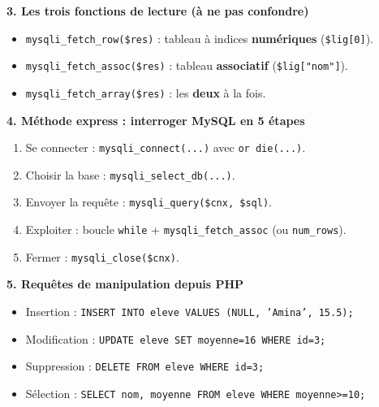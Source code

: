 \documentclass[11pt]{article}
\begin{document}
\begin{bilan}
\textbf{3. Les trois fonctions de lecture (à ne pas confondre)}
\begin{itemize}
  \item \texttt{mysqli\_fetch\_row(\$res)} : tableau à indices \textbf{numériques} (\texttt{\$lig[0]}).
  \item \texttt{mysqli\_fetch\_assoc(\$res)} : tableau \textbf{associatif} (\texttt{\$lig["nom"]}).
  \item \texttt{mysqli\_fetch\_array(\$res)} : les \textbf{deux} à la fois.
\end{itemize}

\textbf{4. Méthode express : interroger MySQL en 5 étapes}
\begin{enumerate}
  \item Se connecter : \texttt{mysqli\_connect(...)} avec \texttt{or die(...)}.
  \item Choisir la base : \texttt{mysqli\_select\_db(...)}.
  \item Envoyer la requête : \texttt{mysqli\_query(\$cnx, \$sql)}.
  \item Exploiter : boucle \texttt{while} + \texttt{mysqli\_fetch\_assoc} (ou \texttt{num\_rows}).
  \item Fermer : \texttt{mysqli\_close(\$cnx)}.
\end{enumerate}

\textbf{5. Requêtes de manipulation depuis PHP}
\begin{itemize}
  \item Insertion : \texttt{INSERT INTO eleve VALUES (NULL, 'Amina', 15.5);}
  \item Modification : \texttt{UPDATE eleve SET moyenne=16 WHERE id=3;}
  \item Suppression : \texttt{DELETE FROM eleve WHERE id=3;}
  \item Sélection : \texttt{SELECT nom, moyenne FROM eleve WHERE moyenne>=10;}
\end{itemize}
\end{bilan}
\end{document}
